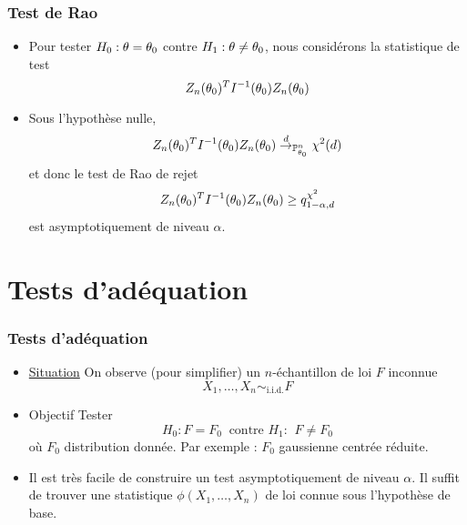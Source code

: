 \begin{frame}
\frametitle{Test de Rao}
\begin{itemize}
\item Pour tester $H_0: \theta= \theta_0$ contre $H_1: \theta \ne \theta_0$, nous considérons la statistique de test
\[
Z_n(\theta_0)^T I^{-1} (\theta_0) Z_n(\theta_0)
\]
\item Sous l'hypothèse nulle,
$$
Z_n(\theta_0)^T I^{-1} (\theta_0) Z_n(\theta_0) \stackrel{d}{\rightarrow}_{\operatorname{{\mathbb P}}_{\theta_0}^n} \chi^2(d)
$$
et donc le test de Rao de rejet
$$
Z_n(\theta_0)^T I^{-1} (\theta_0) Z_n(\theta_0) \geq q_{1-\alpha,d}^{\chi^2}
$$
est asymptotiquement de niveau $\alpha$.
\end{itemize}
\end{frame}

\section{Tests d'adéquation}

\begin{frame}
\frametitle{Tests d'adéquation}
\begin{itemize}
\item \underline{Situation} On observe (pour simplifier) un $n$-échantillon de loi $F$ inconnue
$$X_1,\ldots, X_n\sim_{\text{i.i.d.}}F$$
\item \alert{Objectif} Tester
$$H_0:F=F_0\;\;\text{contre $H_1$:}\;\;F\neq F_0$$
où
$F_0$ distribution donnée. Par exemple : $F_0$ \alert{gaussienne centrée réduite}.
\item Il est \alert{très facile de construire un test asymptotiquement de niveau $\alpha$.}
Il suffit de trouver une statistique $\phi(X_1,\ldots, X_n)$ de loi connue sous l'hypothèse de base.
\end{itemize}
\end{frame}


